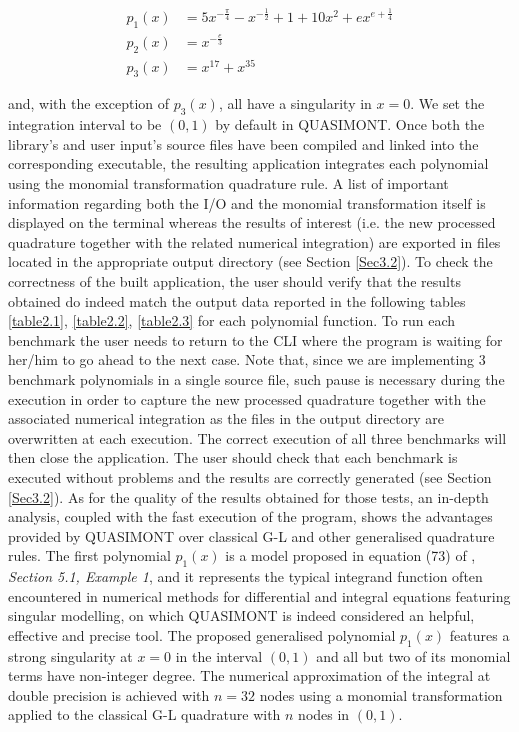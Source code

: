 \documentclass[a4paper, twosided]{book}
\begin{document}
\begin{equation*}
    \begin{split}
        p_1(x) & = 5x^{-\frac{\pi}{4}}-x^{-\frac{1}{2}}+1+10x^{2}+ex^{e+\frac{1}{4}} \\
        p_2(x) & = x^{-\frac{e}{3}} \\
        p_3(x) & = x^{17} + x^{35}
    \end{split}
\end{equation*}

\noindent
and, with the exception of $p_3(x)$, all have a singularity in $x=0$.  We set the integration interval to be $(0,1)$ by default in QUASIMONT. Once both the library's and user input's source files have been compiled and linked into the corresponding executable, the resulting application integrates each polynomial using the monomial transformation quadrature rule. A list of important information regarding both the I/O and the monomial transformation itself is displayed on the terminal whereas the results of interest (i.e. the new processed quadrature together with the related numerical integration) \color{black}  are exported in files located in the appropriate output directory (see Section \ref{Sec3.2}). To check the correctness of the built application, the user should verify that the results obtained do indeed match the output data reported in the following tables \ref{table2.1}, \ref{table2.2}, \ref{table2.3} for each polynomial function. To run each benchmark the user needs to return to the CLI where the program is waiting for her/him to go ahead to the next case. Note that, since we are implementing $3$ benchmark polynomials in a single source file, such pause is necessary during the execution in order to capture the new processed quadrature together with the associated numerical integration as the files in the output directory are overwritten at each execution. The correct execution of all three benchmarks will then close the application. The user should check that each benchmark is executed without problems and the results are correctly generated (see Section \ref{Sec3.2}). As for the quality of the results obtained for those tests, an in-depth analysis, coupled with the fast execution of the program, shows the advantages provided by QUASIMONT over classical G-L and other generalised quadrature rules. The first polynomial $p_1(x)$ is a model proposed in equation (73) of \cite{Lombardi09}, \textsl{Section 5.1, Example 1}, and it represents the typical integrand function often encountered in numerical methods for differential and integral equations featuring singular modelling, on which QUASIMONT is indeed considered an helpful, effective and precise tool. The proposed generalised polynomial $p_1(x)$ features a strong singularity at $x=0$ in the interval $(0,1)$ and all but two of its monomial terms have non-integer degree. The numerical approximation of the integral at double precision is achieved with $n=32$ nodes using a monomial transformation applied to the classical G-L quadrature with $n$ nodes in $(0,1)$. 
\end{document}
